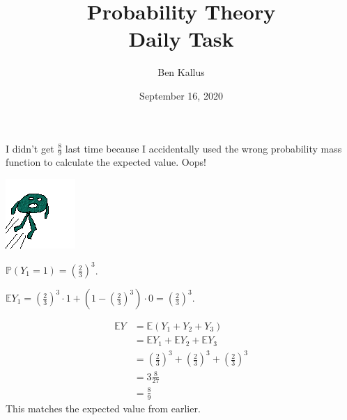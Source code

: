 \documentclass[12pt]{article}
\title{Probability Theory \\ Daily Task}
\author{Ben Kallus}
\date{September 16, 2020}
\begin{document}
\maketitle

I didn't get $\frac89$ last time because I accidentally used the wrong probability mass function to calculate the expected value. Oops!


    \includegraphics{frog.png}


    $\mathbb P(Y_1 = 1) = (\frac23)^3$.


    $\mathbb EY_1 = (\frac23)^3 \cdot 1 + (1 - (\frac23)^3) \cdot 0 = (\frac23)^3$.

    \begin{align*}
        \mathbb EY &= \mathbb E(Y_1 + Y_2 + Y_3) \\
                   &= \mathbb EY_1 + \mathbb EY_2 + \mathbb EY_3 \\
                   &= (\frac23)^3 + (\frac23)^3 + (\frac23)^3 \\
                   &= 3\frac8{27} \\
                   &= \frac89
    \end{align*}
    This matches the expected value from earlier.
\end{document}
